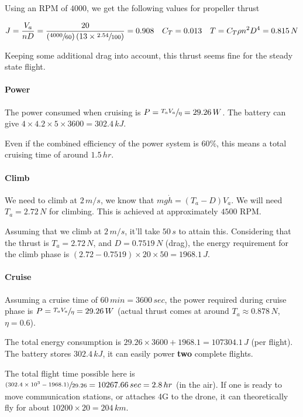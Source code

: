 Using an RPM of $4000$, we get the following values for propeller thrust

\begin{align*}
    J = \frac{V_a}{nD} = \frac{20}{\left ( \sfrac{4000}{60} \right ) \left ( 13 \times \sfrac{2.54}{100} \right )} = 0.908 &&
    C_T = 0.013 &&
    T = C_T \rho n^2 D^4 = 0.815\,N
\end{align*}

Keeping some additional drag into account, this thrust seems fine for the steady state flight.

\paragraph*{Power}

The power consumed when cruising is $P = \sfrac{T_a V_a}{\eta} = 29.26\,W$. The battery can give $4\times 4.2 \times 5 \times 3600 = 302.4\,kJ$.

Even if the combined efficiency of the power system is $60\%$, this means a total cruising time of around $1.5\,hr$.

\paragraph*{Climb}

We need to climb at $2\,m/s$, we know that $mg \dot{h} = (T_a - D) V_a$. We will need $T_a = 2.72\,N$ for climbing. This is achieved at approximately $4500$ RPM.

Assuming that we climb at $2\,m/s$, it'll take $50\,s$ to attain this. Considering that the thrust is $T_a = 2.72\,N$, and $D=0.7519\,N$ (drag), the energy requirement for the climb phase is $(2.72-0.7519)\times 20\times 50 = 1968.1\,J$.

\paragraph*{Cruise}

Assuming a cruise time of $60\,min = 3600\,sec$, the power required during cruise phase is $P = \sfrac{T_a V_a}{\eta} = 29.26\,W$ (actual thrust comes at around $T_a\approx 0.878\,N$, $\eta=0.6$).

The total energy consumption is $29.26\times 3600 + 1968.1 = 107304.1\,J$ (per flight). The battery stores $302.4\,kJ$, it can easily power \textbf{two} complete flights.

The total flight time possible here is $\sfrac{(302.4\times 10^3 - 1968.1)}{29.26} = 10267.66\,sec = 2.8\,hr$ (in the air). If one is ready to move communication stations, or attaches 4G to the drone, it can theoretically fly for about $10200\times 20 = 204\,km$.

